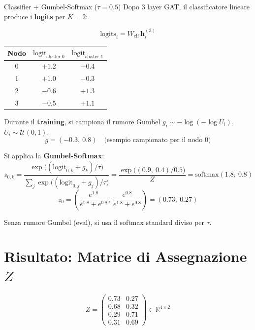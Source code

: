 \documentclass[11pt,a4paper]{article}
\begin{document}
\begin{stepbox}{Classifier + Gumbel-Softmax ($\tau = 0.5$)}
Dopo 3 layer GAT, il classificatore lineare produce i \textbf{logits} per $K=2$:

\[
\text{logits}_i = W_{\text{clf}}\,\mathbf{h}_i^{(3)}
\]

\begin{center}
\begin{tabular}{ccc}
\toprule
Nodo & $\text{logit}_{\text{cluster 0}}$ & $\text{logit}_{\text{cluster 1}}$\\
\midrule
0 & $+1.2$ & $-0.4$\\
1 & $+1.0$ & $-0.3$\\
2 & $-0.6$ & $+1.3$\\
3 & $-0.5$ & $+1.1$\\
\bottomrule
\end{tabular}
\end{center}

\medskip
Durante il \textbf{training}, si campiona il rumore Gumbel $g_i \sim -\log(-\log U_i)$, $U_i\sim\mathcal{U}(0,1)$:
\[
g = (-0.3,\ 0.8)\quad\text{(esempio campionato per il nodo~0)}
\]

Si applica la \textbf{Gumbel-Softmax}:
\[
z_{0,k} = \frac{\exp\!\bigl((\text{logit}_{0,k}+g_k)/\tau\bigr)}{\sum_{j}\exp\!\bigl((\text{logit}_{0,j}+g_j)/\tau\bigr)}
= \frac{\exp\!\bigl((0.9,\ 0.4)/0.5\bigr)}{Z}
= \text{softmax}(1.8,\ 0.8)
\]
\[
z_0 = \left(\frac{e^{1.8}}{e^{1.8}+e^{0.8}},\ \frac{e^{0.8}}{e^{1.8}+e^{0.8}}\right) = (0.73,\ 0.27)
\]

Senza rumore Gumbel (eval), si usa il softmax standard diviso per $\tau$.
\end{stepbox}

\section*{Risultato: Matrice di Assegnazione $Z$}

\[
Z = \begin{pmatrix}
0.73 & 0.27\\
0.68 & 0.32\\
0.29 & 0.71\\
0.31 & 0.69
\end{pmatrix}
\in\mathbb{R}^{4\times 2}
\]
\end{document}
